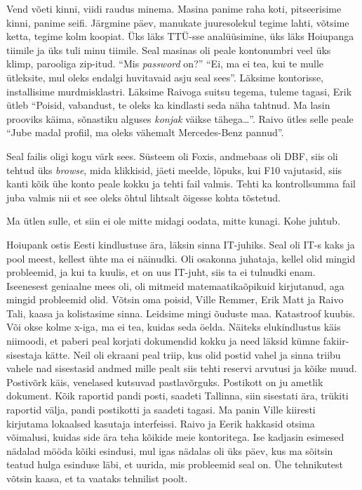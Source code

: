 Vend võeti kinni, viidi raudus minema. Masina panime raha koti, pitseerisime kinni, panime seifi. Järgmine päev, manukate juuresolekul tegime lahti, võtsime ketta, tegime kolm koopiat. Üks läks TTÜ-sse analüüsimine, üks läks Hoiupanga tiimile ja üks tuli minu tiimile. Seal masinas oli peale kontonumbri veel üks klimp, parooliga zip-itud. \enquote{Mis \emph{password} on?} \enquote{Ei, ma ei tea, kui te mulle ütleksite, mul oleks endalgi huvitavaid asju seal sees}. Läksime kontorisse, installisime murdmisklastri. Läksime Raivoga suitsu tegema, tuleme tagasi, Erik ütleb \enquote{Poisid, vabandust, te oleks ka kindlasti seda näha tahtnud. Ma lasin prooviks käima, sõnastiku alguses \emph{konjak} väikse tähega\ldots}. Raivo ütles selle peale \enquote{Jube madal profiil, ma oleks vähemalt Mercedes-Benz  pannud}. 

Seal failis oligi kogu värk sees. Süsteem oli Foxis, andmebaas oli DBF, siis oli tehtud üks \emph{browse}, mida klikkisid, jäeti meelde, lõpuks, kui F10 vajutasid, siis kanti kõik ühe konto peale kokku ja tehti fail valmis. Tehti ka kontrollsumma fail juba valmis nii et see oleks õhtul lihtsalt õigesse kohta tõstetud. 


Ma ütlen sulle, et siin ei ole mitte midagi oodata, mitte kunagi. Kohe juhtub.

Hoiupank ostis Eesti kindlustuse ära, läksin sinna IT-juhiks. Seal oli IT-s kaks ja pool meest, kellest ühte ma ei näinudki. Oli osakonna juhataja, kellel olid mingid probleemid, ja kui ta kuulis, et on uus IT-juht, siis ta ei tulnudki enam. Iseenesest geniaalne mees oli, oli mitmeid matemaatikaõpikuid kirjutanud, aga mingid probleemid olid. Võtsin oma poisid, Ville Remmer, Erik Matt ja Raivo Tali, kaasa ja kolistasime sinna. Leidsime mingi õuduste maa. Katastroof kuubis. Või okse kolme x-iga, ma ei tea, kuidas seda öelda. Näiteks elukindlustus käis niimoodi, et paberi peal korjati dokumendid kokku ja need läksid kümne fakiir-sisestaja kätte. Neil oli ekraani peal triip, kus olid postid vahel ja sinna triibu vahele nad sisestasid andmed mille pealt siis tehti reservi arvutusi ja kõike muud. Postivõrk käis, venelased kutsuvad pastlavõrguks. Postikott on ju ametlik dokument. Kõik raportid pandi posti, saadeti Tallinna, siin sisestati ära, trükiti raportid välja, pandi postikotti ja saadeti tagasi. Ma panin Ville kiiresti kirjutama lokaalsed kasutaja interfeissi. Raivo ja Eerik hakkasid otsima võimalusi, kuidas side ära teha kõikide meie kontoritega. Ise kadjasin  esimesed nädalad mööda kõiki esindusi, mul igas nädalas oli üks päev, kus ma sõitsin teatud hulga esinduse läbi, et uurida, mis probleemid seal on. Ühe tehnikutest võtsin kaasa, et ta vaataks tehnilist poolt. 

